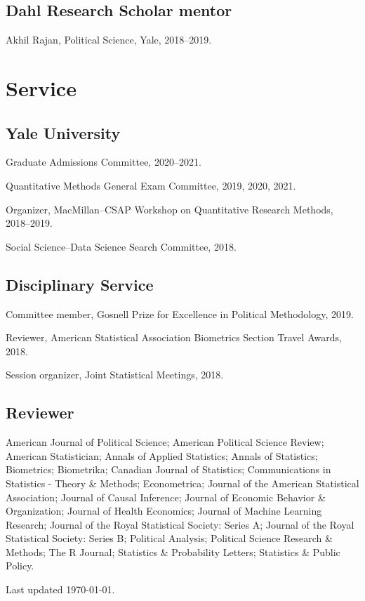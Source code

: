 \documentclass[10pt,letterpaper]{article}
\newenvironment{infolist}{
	\begin{list}{}{
		\setlength{\parskip}{0pt}
		\setlength{\itemsep}{4pt}
		\setlength{\parsep}{0.3em}
		\setlength{\leftmargin}{0em}
		\setlength{\labelwidth}{0em}
		}
	}{
\end{list}
}
\newcommand{\infoitem}[1]{\item {#1}}
\begin{document}
	\subsection*{Dahl Research Scholar mentor}

	\begin{infolist}
		\infoitem{Akhil Rajan, Political Science, Yale, 2018--2019.}
	\end{infolist}


	\section*{Service}

	\subsection*{Yale University}

	\begin{infolist}
		\infoitem{Graduate Admissions Committee, 2020--2021.}
		\infoitem{Quantitative Methods General Exam Committee, 2019, 2020, 2021.}
		\infoitem{Organizer, MacMillan--CSAP Workshop on Quantitative Research Methods, 2018--2019.}
		\infoitem{Social Science--Data Science Search Committee, 2018.}
	\end{infolist}

	\subsection*{Disciplinary Service}

	\begin{infolist}
		\infoitem{Committee member, Gosnell Prize for Excellence in Political Methodology, 2019.}
		\infoitem{Reviewer, American Statistical Association Biometrics Section Travel Awards, 2018.}
		\infoitem{Session organizer, Joint Statistical Meetings, 2018.}
	\end{infolist}

	\subsection*{Reviewer}

	\begin{infolist}
		\infoitem{American Journal of Political Science; American Political Science Review; American Statistician; Annals of Applied Statistics; Annals of Statistics; Biometrics; Biometrika; Canadian Journal of Statistics; Communications in Statistics - Theory \& Methods; Econometrica; Journal of the American Statistical Association; Journal of Causal Inference; Journal of Economic Behavior \& Organization; Journal of Health Economics; Journal of Machine Learning Research; Journal of the Royal Statistical Society: Series A; Journal of the Royal Statistical Society: Series B; Political Analysis; Political Science Research \& Methods; The R Journal; Statistics \& Probability Letters; Statistics \& Public Policy.}
	\end{infolist}

	\bigskip
	{\small Last updated \today.}
\end{document}
